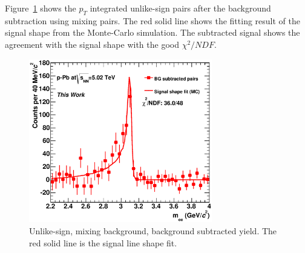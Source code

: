 {Figure~\ref{fig_4_ulsrawsignal} shows  the $p_{T}$ integrated unlike-sign pairs after the background subtraction using mixing pairs.
The red solid line shows the fitting result of the signal shape from the Monte-Carlo simulation.
The subtracted signal shows the agreement with the signal shape with the good $\chi^{2}/NDF$.
\begin{figure}[!h]
  \begin{center}
        \includegraphics[width=8cm]{chap4/figure/RawYield/JpsiIncRawSignal_Cut37.eps}
\end{center}	
 	\label{fig_4_ulsrawsignal}
  \caption{Unlike-sign, mixing background, background subtracted yield. The red solid line is the signal line shape fit. }%
\end{figure}

}
